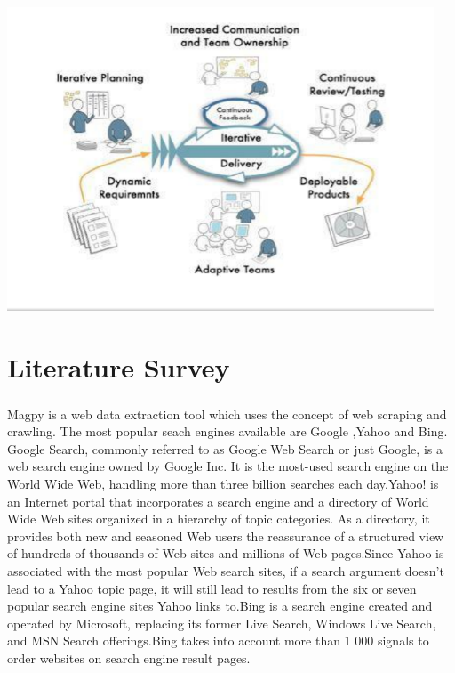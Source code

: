 \documentclass[a4paper]{report}
\begin{document}
\vspace{0.1cm}
\includegraphics[width=5in]{agile1.png} 
\vspace{.1cm}
\chapter{Literature Survey}

\paragraph{}
\large\textnormal{Magpy is a web data extraction tool which uses the concept of web scraping and crawling. The most popular seach engines available are Google ,Yahoo and Bing. Google Search, commonly referred to as Google Web Search or just Google, is a web search engine owned by Google Inc. It is the most-used search engine on the World Wide Web, handling more than three billion searches each day.Yahoo! is an Internet portal that incorporates a search engine and a directory of World Wide Web sites organized in a hierarchy of topic categories. As a directory, it provides both new and seasoned Web users the reassurance of a structured view of hundreds of thousands of Web sites and millions of Web pages.Since Yahoo is associated with the most popular Web search sites, if a search argument doesn't lead to a Yahoo topic page, it will still lead to results from the six or seven popular search engine sites Yahoo links to.Bing is a search engine created and operated by Microsoft, replacing its former Live Search, Windows Live Search, and MSN Search offerings.Bing takes into account  more than 1 000 signals to order websites on search engine result pages.}
\end{document}
